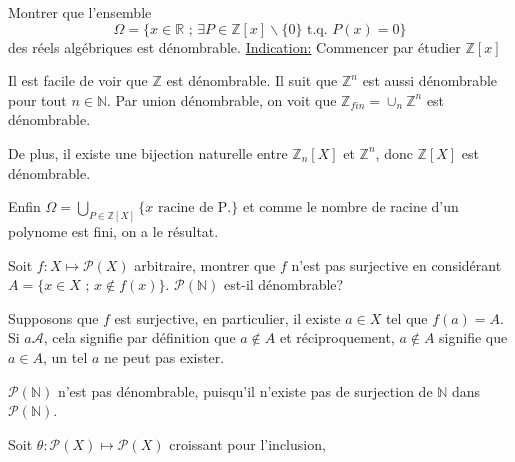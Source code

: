 \documentclass[11pt, answers]{exam}
\newcommand{\N}{\mathbb N}            %
\newcommand{\A}{\mathcal A}            %
\def \N{\mathbb N}
\begin{document}
\begin{questions}
\question Montrer que l'ensemble 
$$
\Omega = \{x\in\mathbb{R}\text{ ; }\exists P\in\mathbb{Z}[x]\backslash \{0\}\text{ t.q. }P(x) = 0\}
$$ 
des réels algébriques est dénombrable. 
\underline{Indication:} Commencer par étudier $\mathbb{Z}[x]$ 
\begin{solution}
Il est facile de voir que $\mathbb Z$ est dénombrable. Il suit que $\mathbb{Z}^n$ est aussi dénombrable pour tout $n\in \mathbb N$. Par union dénombrable, on voit que $\mathbb{Z}_{fin}= \cup_n \mathbb{Z}^n$ est dénombrable.

De plus, il existe une bijection naturelle entre $\mathbb Z_n[X]$ et $\mathbb{Z}^n$, donc $\mathbb{Z}[X]$ est dénombrable.

Enfin $\Omega = \bigcup_{P\in \mathbb{Z}[X]} \{x \text{ racine de P.}\}$ et comme le nombre de racine d'un polynome est fini, on a le résultat.
\end{solution}

\question Soit $f:X\mapsto \mathcal{P}(X)$ arbitraire, montrer que $f$ n'est pas surjective en considérant $A = \{x\in X\text{ ; }x\notin f(x)\}$. $\mathcal{P}(\N)$ est-il dénombrable?
\begin{solution}
Supposons que $f$ est surjective, en particulier, il existe $a\in X$ tel que $f(a)=A$. Si $a\A$, cela signifie par définition que $a\notin A$ et réciproquement, $a\notin A$ signifie que $a\in A$, un tel $a$ ne peut pas exister.

$\mathcal P(\mathbb N)$ n'est pas dénombrable, puisqu'il n'existe pas de surjection de $\mathbb N$ dans $\mathcal{P}(\mathbb{N})$.
\end{solution}

\question Soit $\theta :\mathcal{P}(X)\mapsto\mathcal{P}(X)$ croissant pour l'inclusion, 
\end{questions}
\end{document}
